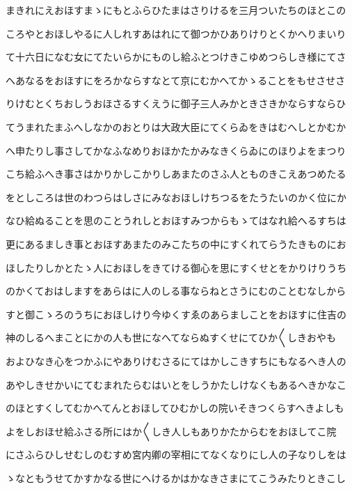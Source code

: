 \documentclass[a4paper,11pt,landscape]{ltjtarticle}
\begin{document}
まきれにえおほすまゝにもとふらひたまはさりけるを三月ついたちのほとこの
\par\medskip
ころやとおほしやるに人しれすあはれにて御つかひありけりとくかへりまいり
\par\medskip
て十六日になむ女にてたいらかにものし給ふとつけきこゆめつらしき様にてさ
\par\medskip
へあなるをおほすにをろかならすなとて京にむかへてかゝることをもせさせさ
\par\medskip
りけむとくちおしうおほさるすくえうに御子三人みかときさきかならすならひ
\par\medskip
てうまれたまふへしなかのおとりは大政大臣にてくらゐをきはむへしとかむか
\par\medskip
へ申たりし事さしてかなふなめりおほかたかみなきくらゐにのほりよをまつり
\par\medskip
こち給ふへき事さはかりかしこかりしあまたのさふ人とものきこえあつめたる
\par\medskip
をとしころは世のわつらはしさにみなおほしけちつるをたうたいのかく位にか
\par\medskip
なひ給ぬることを思のことうれしとおほすみつからもゝてはなれ給へるすちは
\par\medskip
更にあるましき事とおほすあまたのみこたちの中にすくれてらうたきものにお
\par\medskip
ほしたりしかとたゝ人におほしをきてける御心を思にすくせとをかりけりうち
\par\medskip
のかくておはしますをあらはに人のしる事ならねとさうにむのことむなしから
\par\medskip
すと御こゝろのうちにおほしけり今ゆくすゑのあらましことをおほすに住吉の
\par\medskip
神のしるへまことにかの人も世になへてならぬすくせにてひか〱しきおやも
\par\medskip
およひなき心をつかふにやありけむさるにてはかしこきすちにもなるへき人の
\par\medskip
あやしきせかいにてむまれたらむはいとをしうかたしけなくもあるへきかなこ
\par\medskip
のほとすくしてむかへてんとおほしてひむかしの院いそきつくらすへきよしも
\par\medskip
よをしおほせ給ふさる所にはか〱しき人しもありかたからむをおほしてこ院
\par\medskip
にさふらひしせむしのむすめ宮内卿の宰相にてなくなりにし人の子なりしをは
\par\medskip
ゝなともうせてかすかなる世にへけるかはかなきさまにてこうみたりときこし
\par\medskip
\end{document}
